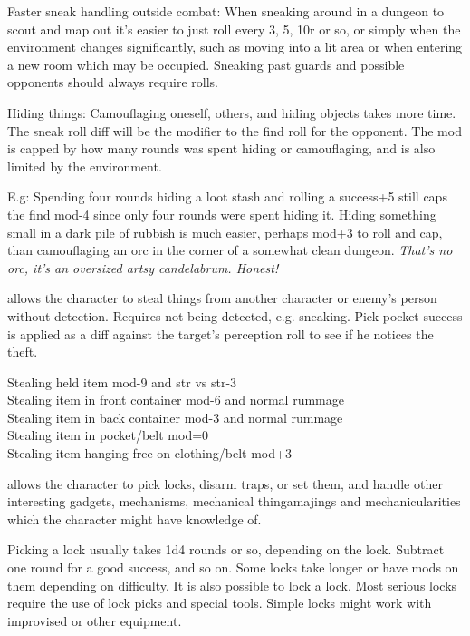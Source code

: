 Faster sneak handling outside combat: When sneaking around in a dungeon to scout and map out it's easier to just roll every 3, 5, 10r or so, or simply when the environment changes significantly, such as moving into a lit area or when entering a new room which may be occupied. Sneaking past guards and possible opponents should always require rolls.

Hiding things: Camouflaging oneself, others, and hiding objects takes more time. The sneak roll diff will be the modifier to the find roll for the opponent. The mod is capped by how many rounds was spent hiding or camouflaging, and is also limited by the environment.

E.g: Spending four rounds hiding a loot stash and rolling a success+5 still caps the find mod-4 since only four rounds were spent hiding it.
Hiding something small in a dark pile of rubbish is much easier, perhaps mod+3 to roll and cap, than camouflaging an orc in the corner of a somewhat clean dungeon. \textit{That's no orc, it's an oversized artsy candelabrum. Honest!}


 allows the character to steal things from another character or enemy's person without detection. Requires not being detected, e.g. sneaking. Pick pocket success is applied as a diff against the target's perception roll to see if he notices the theft.

Stealing held item mod-9 and str vs str-3 \\
Stealing item in front container mod-6 and normal rummage \\
Stealing item in back container mod-3 and normal rummage \\
Stealing item in pocket/belt mod=0 \\
Stealing item hanging free on clothing/belt mod+3


 allows the character to pick locks, disarm traps, or set them, and handle other interesting gadgets, mechanisms, mechanical thingamajings and mechanicularities which the character might have knowledge of.

Picking a lock usually takes 1d4 rounds or so, depending on the lock. Subtract one round for a good success, and so on. Some locks take longer or have mods on them depending on difficulty. It is also possible to lock a lock.
Most serious locks require the use of lock picks and special tools. Simple locks might work with improvised or other equipment.

